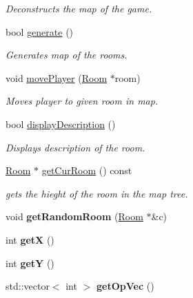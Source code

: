 \begin{DoxyCompactItemize}
\begin{DoxyCompactList}\small\item\em Deconstructs the map of the game. \item\end{DoxyCompactList}\item 
bool \hyperlink{classMap_a5e9b9f6d6acbc48ec4d0b582a0243a32}{generate} ()
\begin{DoxyCompactList}\small\item\em Generates map of the rooms. \item\end{DoxyCompactList}\item 
void \hyperlink{classMap_a23a910ea4dbd706458297c79f587e24f}{movePlayer} (\hyperlink{classRoom}{Room} $\ast$room)
\begin{DoxyCompactList}\small\item\em Moves player to given room in map. \item\end{DoxyCompactList}\item 
bool \hyperlink{classMap_a973b435af324185a04990a4993a90e2d}{displayDescription} ()
\begin{DoxyCompactList}\small\item\em Displays description of the room. \item\end{DoxyCompactList}\item 
\hyperlink{classRoom}{Room} $\ast$ \hyperlink{classMap_a285c84b0ccc05f50ecf4a65fb7f78b43}{getCurRoom} () const 
\begin{DoxyCompactList}\small\item\em gets the hieght of the room in the map tree. \item\end{DoxyCompactList}\item 
\hypertarget{classMap_affafdab59022d13ebd110ed2d67b24cd}{
void {\bfseries getRandomRoom} (\hyperlink{classRoom}{Room} $\ast$\&c)}
\label{classMap_affafdab59022d13ebd110ed2d67b24cd}

\item 
\hypertarget{classMap_a04a1710dd75883506f872cc0857353f5}{
int {\bfseries getX} ()}
\label{classMap_a04a1710dd75883506f872cc0857353f5}

\item 
\hypertarget{classMap_af9e33c6bab74ce8219572530089c8149}{
int {\bfseries getY} ()}
\label{classMap_af9e33c6bab74ce8219572530089c8149}

\item 
\hypertarget{classMap_ab76679f3de70e17fa867a5e8f58de317}{
std::vector$<$ int $>$ {\bfseries getOpVec} ()}
\label{classMap_ab76679f3de70e17fa867a5e8f58de317}


\end{DoxyCompactItemize}
